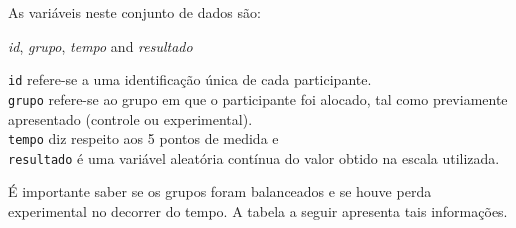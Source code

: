 \documentclass[
]{book}
\newenvironment{Shaded}{\begin{snugshade}}{\end{snugshade}}
\newcommand{\KeywordTok}[1]{\textcolor[rgb]{0.13,0.29,0.53}{\textbf{#1}}}
\newcommand{\NormalTok}[1]{#1}
\newcommand{\OperatorTok}[1]{\textcolor[rgb]{0.81,0.36,0.00}{\textbf{#1}}}
\newcommand{\StringTok}[1]{\textcolor[rgb]{0.31,0.60,0.02}{#1}}
\begin{document}
As variáveis neste conjunto de dados são:

\begin{Shaded}
\end{Shaded}

\emph{id}, \emph{grupo}, \emph{tempo} and \emph{resultado}

\texttt{id} refere-se a uma identificação única de cada participante.\\
\texttt{grupo} refere-se ao grupo em que o participante foi alocado, tal como previamente apresentado (controle ou experimental).\\
\texttt{tempo} diz respeito aos 5 pontos de medida e\\
\texttt{resultado} é uma variável aleatória contínua do valor obtido na escala utilizada.

É importante saber se os grupos foram balanceados e se houve perda experimental no decorrer do tempo. A tabela a seguir apresenta tais informações.

\begin{Shaded}
\end{Shaded}
\end{document}
